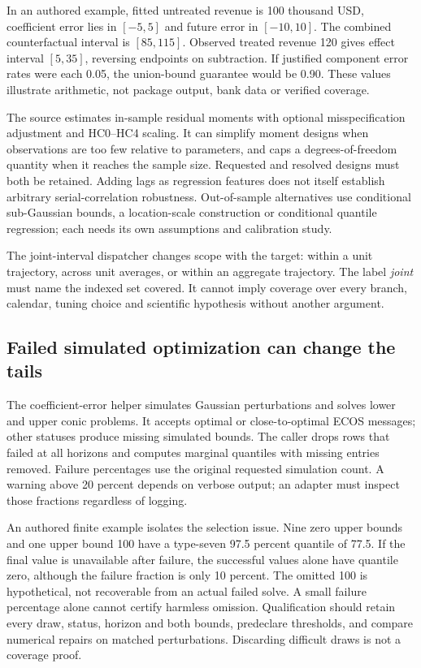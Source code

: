 In an authored example, fitted untreated revenue is 100 thousand USD,
coefficient error lies in $[-5,5]$ and future error in $[-10,10]$. The
combined counterfactual interval is $[85,115]$. Observed treated revenue
120 gives effect interval $[5,35]$, reversing endpoints on subtraction.
If justified component error rates were each 0.05, the union-bound
guarantee would be 0.90. These values illustrate arithmetic, not package
output, bank data or verified coverage.~\citep{exec24_scpi_choice}

The source estimates in-sample residual moments with optional
misspecification adjustment and HC0--HC4 scaling. It can simplify moment
designs when observations are too few relative to parameters, and caps a
degrees-of-freedom quantity when it reaches the sample size. Requested and
resolved designs must both be retained. Adding lags as regression features
does not itself establish arbitrary serial-correlation robustness.
Out-of-sample alternatives use conditional sub-Gaussian bounds, a
location-scale construction or conditional quantile regression; each needs
its own assumptions and calibration study.~\citep{exec24_scpi_source}

The joint-interval dispatcher changes scope with the target: within a unit
trajectory, across unit averages, or within an aggregate trajectory. The
label \emph{joint} must name the indexed set covered. It cannot imply
coverage over every branch, calendar, tuning choice and scientific
hypothesis without another argument.~\citep{exec24_scpi_source,exec24_scpi_choice}

\subsection{Failed simulated optimization can change the tails}
The coefficient-error helper simulates Gaussian perturbations and solves
lower and upper conic problems. It accepts optimal or close-to-optimal
ECOS messages; other statuses produce missing simulated bounds. The caller
drops rows that failed at all horizons and computes marginal quantiles
with missing entries removed. Failure percentages use the original
requested simulation count. A warning above 20 percent depends on verbose
output; an adapter must inspect those fractions regardless of logging.
\citep{exec24_scpi_source}

An authored finite example isolates the selection issue. Nine zero upper
bounds and one upper bound 100 have a type-seven 97.5 percent quantile of
77.5. If the final value is unavailable after failure, the successful
values alone have quantile zero, although the failure fraction is only
10 percent. The omitted 100 is hypothetical, not recoverable from an
actual failed solve. A small failure percentage alone cannot certify
harmless omission. Qualification should retain every draw, status, horizon
and both bounds, predeclare thresholds, and compare numerical repairs on
matched perturbations. Discarding difficult draws is not a coverage proof.
\citep{exec24_scpi_choice}


